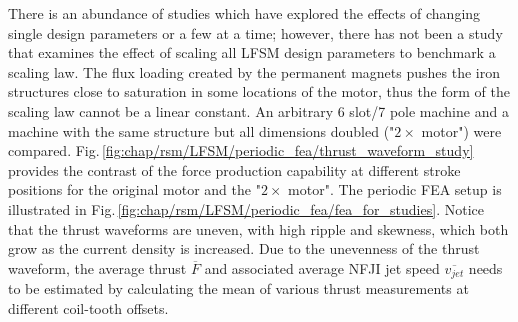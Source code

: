            
            There is an abundance of studies which have explored the effects of changing single design parameters or a few at a time; however, there has not been a study that examines the effect of scaling all \acs{LFSM} design parameters to benchmark a scaling law. The flux loading created by the permanent magnets pushes the iron structures close to saturation in some locations of the motor, thus the form of the scaling law cannot be a linear constant. An arbitrary 6 slot/7 pole machine and a machine with the same structure but all dimensions doubled ("$2\times$ motor") were compared. Fig.\,\ref{fig:chap/rsm/LFSM/periodic_fea/thrust_waveform_study} provides the contrast of the force production capability at different stroke positions for the original motor and the "$2\times$ motor". The periodic \acs{FEA} setup is illustrated in Fig.\,\ref{fig:chap/rsm/LFSM/periodic_fea/fea_for_studies}. Notice that the thrust waveforms are uneven, with high ripple and skewness, which both grow as the current density is increased. Due to the unevenness of the thrust waveform, the average thrust $\overline{F}$ and associated average \acs{NFJI} jet speed $\overline{v_{jet}}$ needs to be estimated by calculating the mean of various thrust measurements at different coil-tooth offsets.
            
